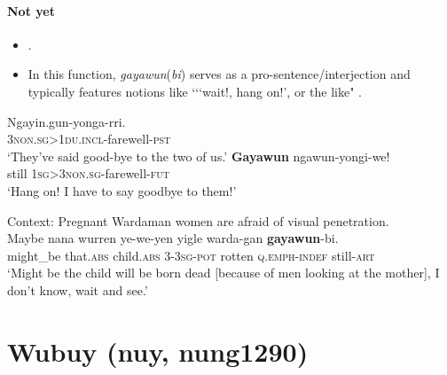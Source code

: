 \paragraph{Not yet}\label{appendixWardamanNotYet}
\begin{itemize}
	\item \textcite[164, 323]{Merlan1994}.
	\item In this function, \textit{gayawun}(\textit{bi}) serves as a pro-sentence/interjection and typically features notions like {\lq\lq}\lq wait!, hang on!', or the like" \parencite[323]{Merlan1994}.
\end{itemize}
\largerpage[2.25]
\begin{exe}
	\ex
	\begin{xlist}
		\gll Ngayin.gun-yonga-rri.\\
		3\textsc{non}.\textsc{sg}>1\textsc{du}.\textsc{incl}-farewell-\textsc{pst}\\
		\glt \lq They've said good-bye to the two of us.'
		\gll \textbf{Gayawun} ngawun-yongi-we!\\
		still 1\textsc{sg}>3\textsc{non}.\textsc{sg}-farewell-\textsc{fut}\\
		\glt \lq Hang on! I have to say goodbye to them!' \parencite[323]{Merlan1994}
	\end{xlist}
	
	\ex Context: Pregnant Wardaman women are afraid of visual penetration.\\
	\gll Maybe nana wurren ye-we-yen yigle warda-gan \textbf{gayawun}-bi.\\
	might\_be that.\textsc{abs} child.\textsc{abs} 3-3\textsc{sg}-\textsc{pot} rotten \textsc{q}.\textsc{emph}-\textsc{indef} still-\textsc{art}\\
	\glt \lq Might be the child will be born dead [because of men looking at the mother], I don't know, wait and see.' \parencite[431]{Merlan1994}
\end{exe}

\section{Wubuy (nuy, nung1290)}\label{appendixWubuy}
